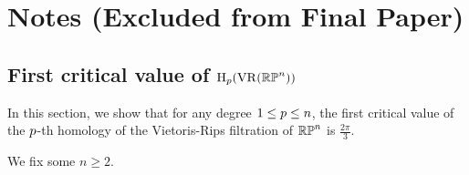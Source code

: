 \section{Notes (Excluded from Final Paper)}







\subsection{First critical value of $\operatorname{H}_p(\operatorname{VR}(\mathbb{RP}^n))$}

In this section, we show that for any degree $1 \leq p \leq n$, the first critical value of the $p$-th homology of the Vietoris-Rips filtration of $\mathbb{RP}^n$ is $\tfrac{2\pi}{3}.$

We fix some $n\geq 2.$


